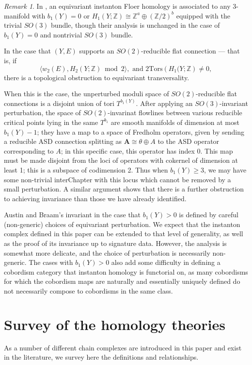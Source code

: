 \documentclass{memo-l}
\theoremstyle{definition}
\theoremstyle{remark}
\newtheorem{remark}[theorem]{Remark}
\numberwithin{section}{chapter}
\numberwithin{equation}{chapter}
\begin{document}
\begin{remark}In \cite{AB}, an equivariant instanton Floer homology is associated to any 3-manifold with $b_1(Y) = 0$ or $H_1(Y;\mathbb Z) \cong \mathbb Z^a \oplus (\mathbb Z/2)^b$ equipped with the trivial $SO(3)$ bundle, though their analysis is unchanged in the case of $b_1(Y) = 0$ and nontrivial $SO(3)$ bundle. 

In the case that $(Y,E)$ supports an $SO(2)$-reducible flat connection --- that is, if 
$$\langle w_2(E), H_2(Y;\mathbb Z) \bmod 2\rangle, \text{  and  } 2\text{Tors}\left(H_1(Y;\mathbb Z\right) \neq 0,$$
there is a topological obstruction to equivariant transversality. 

When this is the case, the unperturbed moduli space of $SO(2)$-reducible flat connections is a disjoint union of tori $T^{b_1(Y)}$. After applying an $SO(3)$-invariant perturbation, the space of $SO(2)$-invarinat flowlines between various reducible critical points lying in the same $T^{b_1}$ are smooth manifolds of dimension at most $b_1(Y) - 1$; they have a map to a space of Fredholm operators, given by sending a reducible ASD connection splitting as $\mathbf{A} \cong \theta \oplus A$ to the ASD operator corresponding to $A$; in this specific case, this operator has index $0$. This map must be made disjoint from the loci of operators with cokernel of dimension at least 1; this is a subspace of codimension 2. Thus when $b_1(Y) \geq 3$, we may have some non-trivial interChapter with this locus which cannot be removed by a small perturbation. A similar argument shows that there is a further obstruction to achieving invariance than those we have already identified. 

Austin and Braam's invariant in the case that $b_1(Y) > 0$ is defined by careful (non-generic) choices of equivariant perturbation. We expect that the instanton complex defined in this paper can be extended to that level of generality, as well as the proof of its invariance up to signature data. However, the analysis is somewhat more delicate, and the choice of perturbation is necessarily non-generic. The cases with $b_1(Y) > 0$ also add some difficulty in defining a cobordism category that instanton homology is functorial on, as many cobordisms for which the cobordism maps are naturally and essentially uniquely defined do not necessarily compose to cobordisms in the same class.
\end{remark}
%
%
%
\section{Survey of the homology theories}
As a number of different chain complexes are introduced in this paper and exist in the literature, we survey here the definitions and relationships. 
\end{document}

